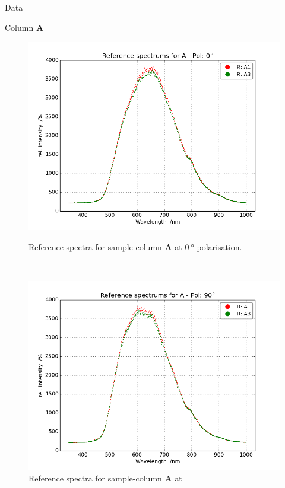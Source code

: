 \begin{appendix}
\begin{chapter}{Data}
\begin{section}{Column \textbf{A}}
      \begin{figure}[ht!]
        \centering
        \begin{minipage}{.92\textwidth}
          \centering
          \includegraphics[width=\textwidth]{Figures/Refspec_APol0.png}
          \caption{Reference spectra for sample-column \textbf{A} at
              $\SI{0}{\degree}$ polarisation.}
          \label{fig:Refspec_APol0}
        \end{minipage}\\
        \begin{minipage}{.92\textwidth}
          \centering
          \includegraphics[width=\textwidth]{Figures/Refspec_APol90.png}
          \caption{Reference spectra for sample-column \textbf{A} at
}
\end{minipage}
\end{figure}
\end{section}
\end{chapter}
\end{appendix}
